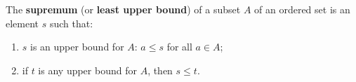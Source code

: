 The \textbf{supremum} (or \textbf{least upper bound}) of a subset $A$ of an ordered set is an element $s$ such that:
\begin{enumerate}
\item $s$ is an upper bound for $A$: $a \leq s$ for all $a \in A$;
\item if $t$ is any upper bound for $A$, then $s \leq t$.
\end{enumerate}
